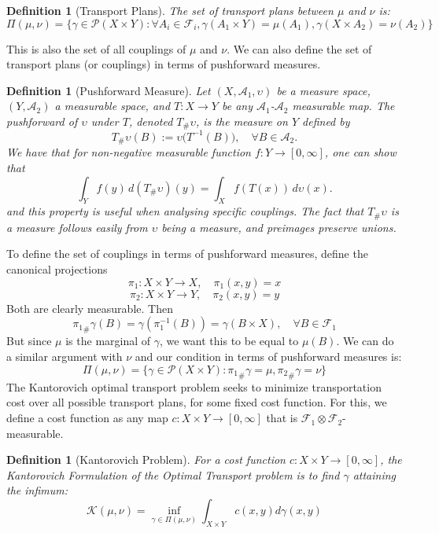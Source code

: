 \documentclass[11pt,a4paper]{article}
\newtheorem{definition}[theorem]{Definition}
\theoremstyle{remark}
\begin{document}
\begin{definition}[Transport Plans]
The set of transport plans between \( \mu \) and \( \nu \) is:
\[
\Pi(\mu,\nu) = \{\gamma \in \mathcal{P}(X \times Y) : \forall A_i \in \mathcal{F}_i, \gamma (A_1 \times Y) = \mu (A_1), \gamma (X \times A_2) = \nu (A_2)\}
\]
\end{definition}
\noindent 
This is also the set of all couplings of $\mu$ and $\nu$. We can also define the set of transport plans (or couplings) in terms of pushforward measures.

\begin{definition}[Pushforward Measure]
Let $(X, \mathcal{A}_1, \upsilon)$ be a measure space, $(Y, \mathcal{A}_2)$ a measurable space, and $T : X \to Y$ be any $\mathcal{A}_1$-$\mathcal{A}_2$ measurable map. The \emph{pushforward} of $\upsilon$ under $T$, denoted $T_\# \upsilon$, is the measure on $Y$ defined by
\[
T_\# \upsilon(B) := \upsilon\big(T^{-1}(B)\big), \quad \forall B \in \mathcal{A}_2.
\]
We have that for non-negative measurable function $f : Y \to [0, \infty]$, one can show that
\[
\int_Y f(y) \, d(T_\# \upsilon)(y) = \int_X f(T(x)) \, d\upsilon(x).
\]
and this property is useful when analysing specific couplings. The fact that ${T_{\#}}{\upsilon}$ is a measure follows easily from $\upsilon$ being a measure, and preimages preserve unions.
\end{definition}

\noindent To define the set of couplings in terms of pushforward measures, define the canonical projections 
\[\pi_1: X \times Y \to X, \quad \pi_1 (x,y) = x
\]
\[
\pi_2: X \times Y \to Y, \quad \pi_2 (x,y) = y
\]
Both are clearly measurable. Then \[
{\pi _1}_{\#}\gamma (B) = \gamma (\pi_1 ^{-1} (B)) = \gamma (B \times X), \quad \forall B \in \mathcal{F}_1
\]
But since $\mu$ is the marginal of $\gamma$, we want this to be equal to $\mu (B)$. We can do a similar argument with $\nu$ and our condition in terms of pushforward measures is:
\[
\Pi(\mu,\nu) = \{\gamma \in \mathcal{P}(X \times Y) : {\pi_1}_{\#}\gamma = \mu, {\pi_2}_{\#}\gamma = \nu\}
\]
\noindent
The Kantorovich optimal transport problem seeks to minimize transportation cost over all possible transport plans, for some fixed cost function. For this, we define a cost function as any map $c: X \times Y \to [0, \infty]$ that is $\mathcal{F}_1 \otimes \mathcal{F}_2$-measurable.

\begin{definition}[Kantorovich Problem]
For a cost function \( c: X \times Y \to [0,\infty] \), the Kantorovich Formulation of the Optimal Transport problem is to find $\gamma$ attaining the infimum:
\[
\mathcal{K}(\mu,\nu) = \inf_{\gamma \in \Pi(\mu,\nu)} \int_{X \times Y} c(x,y) d\gamma(x,y)
\]
\end{definition}
\end{document}
